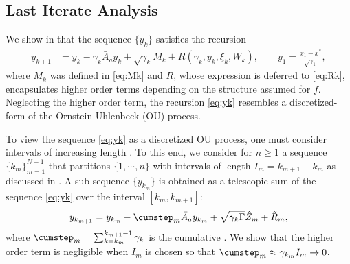 \documentclass[11pt]{article}
\begin{document}
\subsection{Last Iterate Analysis}\label{sec:general}
We show in  that the sequence $\{y_k\}$ satisfies the recursion
\begin{equation}\label{eq:yk}
\begin{split}
    y_{k+1} &= y_k - \gamma_k \bar{A}_a y_k + \sqrt{\gamma_k} M_k + R (\gamma_k, y_k, \xi_k, W_k)  ,
    \qquad 
    y_1 = \frac{x_1 - x^*}{\sqrt{\gamma_1}} ,
\end{split}
\end{equation}
where $M_k$ was defined in \eqref{eq:Mk} and $R$, whose expression is deferred to \eqref{eq:Rk}, encapsulates higher order terms depending on the structure assumed for $f$. 
Neglecting the higher order term, the recursion \eqref{eq:yk} resembles a discretized-form of the Ornstein-Uhlenbeck (OU) process. 








To view the sequence \eqref{eq:yk} as a discretized OU process, one must consider intervals of increasing length \citep{bertsekas_ndp}. 
To this end, we consider for $n \geq 1$ a sequence $\{k_m\}_{m=1}^{N+1}$ that partitions $\{1, \cdots, n\}$ with intervals of length $I_m = k_{m+1} - k_m$ as discussed in . 
A sub-sequence $\{y_{k_m}\}$ is obtained as a telescopic sum of the sequence \eqref{eq:yk} over the interval $[k_m, k_{m+1}]$:
\begin{equation}\label{eq:ytildem}
    y_{k_{m+1}} 
    = y_{k_m} - \cumstep_m \bar{A}_a y_{k_m} + \sqrt{\gamma_k \Gamma} \hat{Z}_m + \tilde{R}_m ,     
\end{equation}
where $\cumstep_m = \sum_{k=k_m}^{k_{m+1} - 1} \gamma_k$ is the cumulative \stepsize.
We show that the higher order term is negligible when $I_m$ is chosen so that $\cumstep_m \approx \gamma_{k_m} I_m \to 0$.
\end{document}
